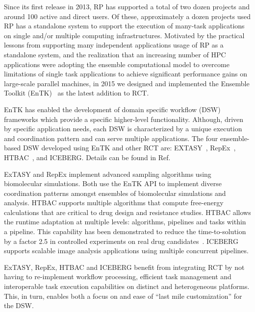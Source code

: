 \documentclass[preprint,12pt, a4paper]{elsarticle}
\begin{document}
Since its first release in 2013, RP has supported a total of two dozen
projects and around 100 active and direct users. Of these, approximately a
dozen projects used RP has a standalone system to support the execution of
many-task applications on single and/or multiple computing infrastructures.
Motivated by the practical lessons from supporting many independent
applications usage of RP as a standalone system, and the realization that an
increasing number of HPC applications were adopting the ensemble
computational model to overcome limitations of single task applications to
achieve significant performance gains on large-scale parallel machines, in
2015 we designed and implemented the Ensemble Toolkit
(EnTK)~\citep{balasubramanian2016extasy} as the latest addition to RCT.

EnTK has enabled the development of domain specific workflow (DSW) frameworks
which provide a specific higher-level functionality. Although, driven by
specific application needs, each DSW is characterized by a unique execution
and coordination pattern and can serve multiple applications. The four
ensemble-based DSW developed using EnTK and other RCT are:
EXTASY~\cite{balasubramanian2016extasy}, RepEx~\cite{treikalis2016repex},
HTBAC~\cite{dakka2018high}, and ICEBERG\@. Details can be found in
Ref.~\citep{turilli2019middleware}

ExTASY and RepEx implement advanced sampling algorithms using biomolecular
simulations. Both use the EnTK API to implement  diverse coordination
patterns amongst ensembles of biomolecular simulations and analysis. HTBAC
supports multiple algorithms that compute free-energy calculations that are
critical to drug design and resistance studies. HTBAC allows the runtime
adaptation at multiple levels: algorithms, pipelines and tasks within a
pipeline. This capability has been demonstrated to reduce the
time-to-solution by a factor 2.5 in controlled experiments on real drug
candidates~\citep{dakka2018concurrent}. ICEBERG supports scalable image
analysis applications using multiple concurrent pipelines.

ExTASY, RepEx, HTBAC and ICEBERG benefit from integrating RCT by not having
to re-implement workflow processing, efficient task management and
interoperable task execution capabilities on distinct and heterogeneous
platforms. This, in turn, enables both a focus on and ease of ``last mile
customization'' for the DSW\@.
\end{document}
